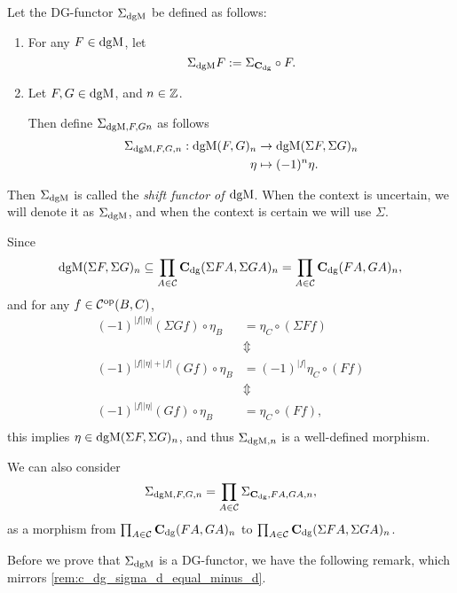 \begin{definition}
    \label{def:sigma_dgmod}
    Let the DG-functor \( \Sigma_{\operatorname{dgM}} \) be defined as follows:
    \begin{enumerate}
        \item {
            For any \( F \in \operatorname{dgM} \), let
            \[
                \Sigma_{\operatorname{dgM}} F := \Sigma_{\operatorname{\mathbf{C}}_{\operatorname{dg}}} \circ F.
            \]
        }
        \item {
            Let \( F, G \in \operatorname{dgM} \), and \( n \in {\mathbb{Z}} \).
            
            Then define \( \Sigma_{\operatorname{dgM}, F, G n} \) as follows
            \begin{align*}
                \Sigma_{\operatorname{dgM}, F, G, n}: \operatorname{dgM}(F, G)_n &\to \operatorname{dgM}(\Sigma F, \Sigma G)_n \\
                \eta &\mapsto (-1)^n \eta.
            \end{align*}
        }
    \end{enumerate}
    Then \( \Sigma_{\operatorname{dgM}} \) is called the \emph{shift functor of \( \operatorname{dgM} \)}. When the context is uncertain, we will denote it as \( \Sigma_{\operatorname{dgM}} \), and when the context is certain we will use \( \Sigma \).
\end{definition}

Since
\[
    \operatorname{dgM}(\Sigma F, \Sigma G)_n \subseteq \prod_{A \in {\mathcal{C}}} \operatorname{\mathbf{C}}_{\operatorname{dg}}(\Sigma F A, \Sigma G A)_n = \prod_{A \in {\mathcal{C}}} \operatorname{\mathbf{C}}_{\operatorname{dg}}(F A, G A)_n,
\]
and for any \( f \in {\mathcal{C}}^{\operatorname{op}}(B, C) \),
\begin{align*}
    (-1)^{|f||\eta|}(\Sigma G f) \circ \eta_{B} &= \eta_{C} \circ (\Sigma F f) \\
    &\Updownarrow \\
    (-1)^{|f||\eta| + |f|} (G f) \circ \eta_{B} &= (-1)^{|f|} \eta_{C} \circ (F f) \\
    &\Updownarrow \\
    (-1)^{|f||\eta|}(G f) \circ \eta_{B} &= \eta_{C} \circ (F f), \\
\end{align*}
this implies \( \eta \in \operatorname{dgM}(\Sigma F, \Sigma G)_n \), and thus \( \Sigma_{\operatorname{dgM}, n} \) is a well-defined morphism.

We can also consider
\[
    \Sigma_{\operatorname{dgM}, F, G, n} = \prod_{A \in {\mathcal{C}}} \Sigma_{\operatorname{\mathbf{C}}_{\operatorname{dg}}, F A, G A, n},
\] 
as a morphism from \( \prod_{A \in {\mathcal{C}}} \operatorname{\mathbf{C}}_{\operatorname{dg}}(F A, G A)_n \) to \( \prod_{A \in {\mathcal{C}}} \operatorname{\mathbf{C}}_{\operatorname{dg}}(\Sigma F A, \Sigma G A)_n \).

Before we prove that \( \Sigma_{\operatorname{dgM}} \) is a DG-functor, we have the following remark, which mirrors \autoref{rem:c_dg_sigma_d_equal_minus_d}.

